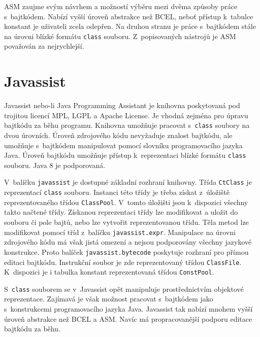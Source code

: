 ASM zaujme svým návrhem a možností výběru mezi dvěma způsoby práce s~bajtkódem. Nabízí vyšší úroveň abstrakce než BCEL, neboť přístup k~tabulce konstant je uživateli zcela odepřen. Na druhou stranu je práce s~bajtkódem stále na úrovni blízké formátu \texttt{class} souboru. Z~popisovaných nástrojů je ASM považován za nejrychlejší.

\section{Javassist}\label{Tools:Javassist}

Javassist \cite{Javassist} nebo-li Java Programming Assistant je knihovna poskytovaná pod trojitou licencí MPL, LGPL a Apache License. Je vhodná zejména pro úpravu bajtkódu za běhu programu. Knihovna umožňuje pracovat s~\texttt{class} soubory na dvou úrovních. Úroveň zdrojového kódu nevyžaduje znalost bajtkódu, ale umožňuje s~bajtkódem manipulovat pomocí slovníku programovacího jazyka Java. Úroveň bajtkódu umožňuje přístup k~reprezentaci blízké formátu \texttt{class} souboru. Java 8 je podporovaná.

V~balíčku \texttt{javassist} je dostupné základní rozhraní knihovny. Třída \texttt{CtClass} je reprezentací \texttt{class} souboru. Instanci této třídy je třeba získat z~úložiště reprezentovaného třídou \texttt{ClassPool}. V~tomto úložišti jsou k~dispozici všechny takto načtené třídy. Získanou reprezentaci třídy lze modifikovat a uložit do souboru či pole bajtů, nebo lze vytvořit reprezentovanou třídu. Těla metod lze modifikovat pomocí tříd z~balíčku \texttt{javassist.expr}. Manipulace na úrovni zdrojového kódu má však jistá omezení a nejsou podporovány všechny jazykové konstrukce. Proto balíček \texttt{javassist.bytecode} poskytuje rozhraní pro přímou editaci bajtkódu. Instrukční soubor je zde reprezentovaný třídou \texttt{ClassFile}. K~dispozici je i tabulka konstant reprezentovaná třídou \texttt{ConstPool}.

S~\texttt{class} souborem se v~Javassist opět manipuluje prostřednictvím objektové reprezentace. Zajímavá je však možnost pracovat s~bajtkódem jako s~konstrukcemi programovacího jazyka Java. Javassist tak nabízí mnohem vyšší úroveň abstrakce než BCEL a ASM. Navíc má propracovanější podporu editace bajtkódu za běhu.

